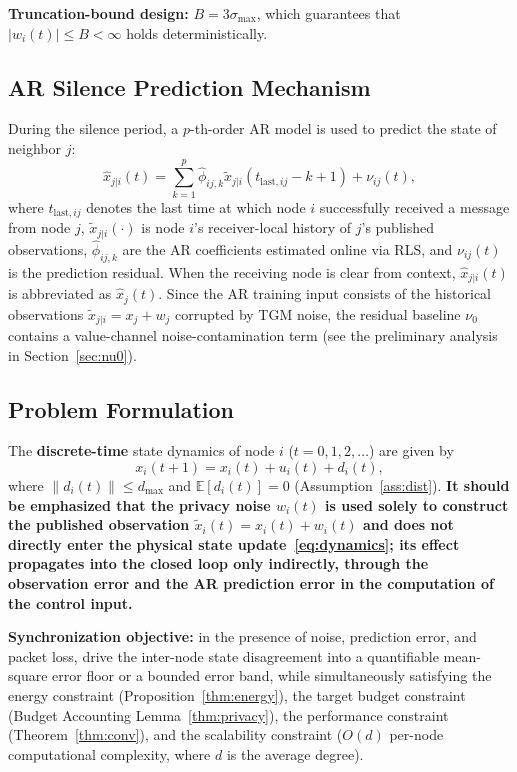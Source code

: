 \documentclass[10pt]{article}
\newcommand{\dmax}{d_{\max}}
\begin{document}
\textbf{Truncation-bound design:} $B=3\sigma_{\max}$, which guarantees that $|w_i(t)|\leq B<\infty$ holds deterministically.

\subsection{AR Silence Prediction Mechanism}

During the silence period, a $p$-th-order AR model is used to predict the state of neighbor $j$:
\begin{equation}
  \hat{x}_{j|i}(t) = \sum_{k=1}^{p}\hat{\phi}_{ij,k}\tilde{x}_{j|i}(t_{\mathrm{last},ij}-k+1) + \nu_{ij}(t),
\end{equation}
where $t_{\mathrm{last},ij}$ denotes the last time at which node $i$ successfully received a message from node $j$, $\tilde{x}_{j|i}(\cdot)$ is node $i$'s receiver-local history of $j$'s published observations, $\hat{\phi}_{ij,k}$ are the AR coefficients estimated online via RLS, and $\nu_{ij}(t)$ is the prediction residual. When the receiving node is clear from context, $\hat{x}_{j|i}(t)$ is abbreviated as $\hat{x}_j(t)$. Since the AR training input consists of the historical observations $\tilde{x}_{j|i}=x_j+w_j$ corrupted by TGM noise, the residual baseline $\nu_0$ contains a value-channel noise-contamination term (see the preliminary analysis in Section~\ref{sec:nu0}).

\subsection{Problem Formulation}

The \textbf{discrete-time} state dynamics of node $i$ ($t=0,1,2,\ldots$) are given by
\begin{equation}\label{eq:dynamics}
  x_i(t+1) = x_i(t) + u_i(t) + d_i(t),
\end{equation}
where $\|d_i(t)\|\leq\dmax$ and $\mathbb{E}[d_i(t)]=0$ (Assumption~\ref{ass:dist}). \textbf{It should be emphasized that the privacy noise $w_i(t)$ is used solely to construct the published observation $\tilde{x}_i(t)=x_i(t)+w_i(t)$ and does not directly enter the physical state update~\eqref{eq:dynamics}; its effect propagates into the closed loop only indirectly, through the observation error and the AR prediction error in the computation of the control input.}

\textbf{Synchronization objective:} in the presence of noise, prediction error, and packet loss, drive the inter-node state disagreement into a quantifiable mean-square error floor or a bounded error band, while simultaneously satisfying the energy constraint (Proposition~\ref{thm:energy}), the target budget constraint (Budget Accounting Lemma~\ref{thm:privacy}), the performance constraint (Theorem~\ref{thm:conv}), and the scalability constraint ($O(d)$ per-node computational complexity, where $d$ is the average degree).
\end{document}
